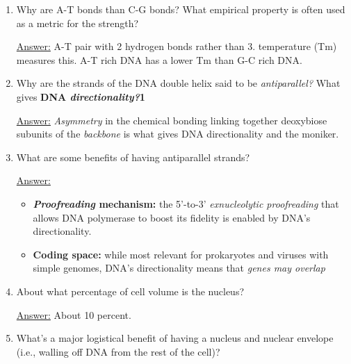 \documentclass{article}
\newenvironment{QandA}{\begin{enumerate}[label=\bfseries Q\arabic*.]}
                       {\end{enumerate}}
\newenvironment{answered}{\par\normalfont\underline{Answer:}}{}
\begin{document}
\begin{QandA}
\begin{answered}
\begin{itemize}
      \item{In the sugar-phosphate \textbf{backbone} covalent bonds stabilize the double helical structure while the bases bond noncavently, with hydrogen bonds.}
      \item{External : stronger : covalent :: internal : weaker : noncovalent}
      \item{C-G : 3 :: A-T : 2}
    \end{itemize}
    \end{answered}
  \item{Why are A-T bonds  than C-G bonds? What empirical property is often used as a metric for the strength?}
    \begin{answered}
    A-T pair with 2 hydrogen bonds rather than 3.  temperature (Tm) measures this. A-T rich DNA has a lower Tm than G-C rich DNA.
    \end{answered}
  \item{Why are the strands of the DNA double helix said to be \textit{antiparallel?} What gives \textbf{DNA \textit{directionality?}1}}
    \begin{answered}
    \textit{Asymmetry} in the chemical bonding linking together deoxybiose subunits of the \textit{backbone} is what gives DNA directionality and the  moniker.
    \end{answered}
  \item{What are some benefits of having antiparallel strands?}
    \begin{answered}
    \begin{itemize}
      \item{\textbf{\textit{Proofreading} mechanism:} the 5'-to-3' \textit{exnucleolytic proofreading} that allows DNA polymerase to boost its fidelity is enabled by DNA's directionality.}
      \item{\textbf{Coding space:} while most relevant for prokaryotes and viruses with simple genomes, DNA's directionality means that \textit{genes may overlap}}
    \end{itemize}
    \end{answered}
  \item{About what percentage of cell volume is the nucleus?}
    \begin{answered}
    About 10 percent.
    \end{answered}
  \item{What's a major logistical benefit of having a nucleus and nuclear envelope (i.e., walling off DNA from the rest of the cell)?}

\end{QandA}
\end{document}
